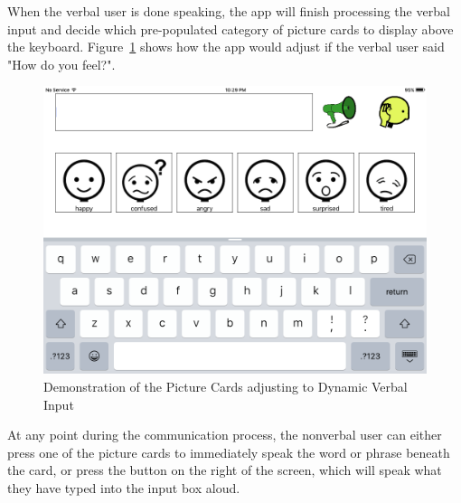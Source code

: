 When the verbal user is done speaking, the app will finish processing the verbal input and decide which pre-populated category of picture cards to display above the keyboard. Figure~\ref{fig:uiDynamic} shows how the app would adjust if the verbal user said "How do you feel?". 

\begin{figure}[htb]
\centering
\includegraphics[width=\textwidth]{dynamicInterface.png}
\caption{Demonstration of the Picture Cards adjusting to Dynamic Verbal Input}
\label{fig:uiDynamic}
\end{figure}

At any point during the communication process, the nonverbal user can either press one of the picture cards to immediately speak the word or phrase beneath the card, or press the button on the right of the screen, which will speak what they have typed into the input box aloud.